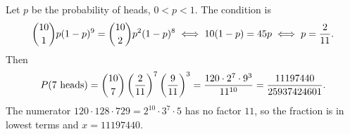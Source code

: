 Let $p$ be the probability of heads, $0<p<1$. The condition is
\[\dbinom{10}{1}p(1-p)^9=\dbinom{10}{2}p^2(1-p)^8\iff10(1-p)=45p\iff p=\dfrac{2}{11}.\]
Then
\[P(7\text{ heads})=\dbinom{10}{7}\left(\dfrac{2}{11}\right)^7\left(\dfrac{9}{11}\right)^3=\dfrac{120\cdot2^7\cdot9^3}{11^{10}}=\dfrac{11197440}{25937424601}.\]
The numerator $120\cdot128\cdot729=2^{10}\cdot3^7\cdot5$ has no factor $11$, so the fraction is in lowest terms and $x=\boxed{11197440}$.
